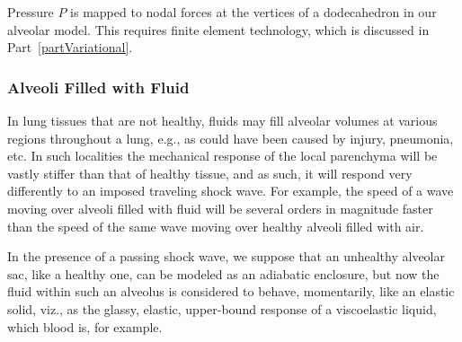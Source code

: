 Pressure $P$ is mapped to nodal forces at the vertices of a dodecahedron in our alveolar model.  This requires finite element technology, which is discussed in Part~\ref{partVariational}.

\subsubsection{Alveoli Filled with Fluid}

In lung tissues that are not healthy, fluids may fill alveolar volumes at various regions throughout a lung, e.g., as could have been caused by injury, pneumonia, etc.  In such localities the mechanical response of the local parenchyma will be vastly stiffer than that of healthy tissue, and as such, it will respond very differently to an imposed traveling shock wave.  For example, the speed of a wave moving over alveoli filled with fluid will be several orders in magnitude faster than the speed of the same wave moving over healthy alveoli filled with air.

In the presence of a passing shock wave, we suppose that an unhealthy alveolar sac, like a healthy one, can be modeled as an adiabatic enclosure, but now the fluid within such an alveolus is considered to behave, momentarily, like an elastic solid, viz., as the glassy, elastic, upper-bound response of a visco\-elastic liquid, which blood is, for example.

